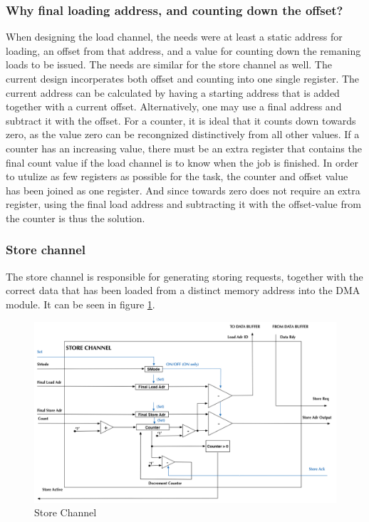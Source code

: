\begin{appendix}
\subsubsection{Why final loading address, and counting down the offset?}
When designing the load channel, the needs were at least a static address for loading, an offset from that address, and a value for counting down the remaning loads to be issued.
The needs are similar for the store channel as well.
The current design incorperates both offset and counting into one single register.
The current address can be calculated by having a starting address that is added together with a current offset.
Alternatively, one may use a final address and subtract it with the offset.
 For a counter, it is ideal that it counts down towards zero, as the value zero can be recongnized distinctively from all other values.
If a counter has an increasing value, there must be an extra register that contains the final count value if the load channel is to know when the job is finished.
In order to utulize as few registers as possible for the task, the counter and offset value has been joined as one register.
And since towards zero does not require an extra register, using the final load address and subtracting it with the offset-value from the counter is thus the solution.


\subsubsection{Store channel}
The store channel is responsible for generating storing requests, together with the correct data that has been loaded from a distinct memory address into the DMA module.
It can be seen in figure \ref{fig:storeChannel}.


\begin{figure}[h!]
    \centering
    \includegraphics[width=1.0\textwidth]{Figures/DMA/StoreChannel}
    \caption{Store Channel}
    \label{fig:storeChannel}
\end{figure}


\end{appendix}
